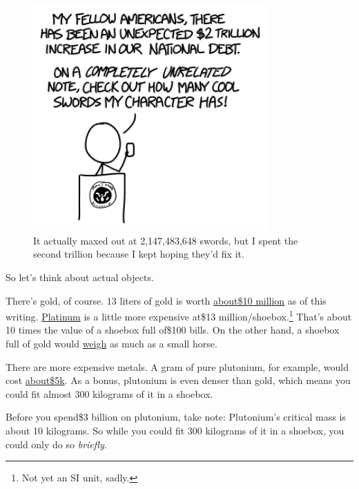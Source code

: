 {\begin{figure}[!htbp]
\centering
\includegraphics[scale=0.5, max width=0.8\textwidth]{imgs/a/108/president.png}
\caption{It actually maxed out at 2,147,483,648 swords, but I spent the second trillion because I kept hoping they'd fix it.}
\end{figure}

{So let's think about actual objects.}

{There's gold, of course. 13 liters of gold is worth \href{http://www.wolframalpha.com/input/?i=13+liters+*+gold+density+*+gold+price}{about\$10 million} as of this writing. \href{http://www.wolframalpha.com/input/?i=13+liters+*+platinum+density+*+platinum+price}{Platinum} is a little more expensive at\$13 million/shoebox.{\footnote{Not yet an SI unit, sadly.} } That's about 10 times the value of a shoebox full of\$100 bills. On the other hand, a shoebox full of gold would \href{http://www.wolframalpha.com/input/?i=gold+density+*+13+liters}{weigh} as much as a small horse.}

{There are more expensive metals. A gram of pure plutonium, for example, would cost \href{http://hypertextbook.com/facts/2008/AndrewMorel.shtml}{about\$5k}. As a bonus, plutonium is even denser than gold, which means you could fit almost 300 kilograms of it in a shoebox.}

{Before you spend\$3 billion on plutonium, take note: Plutonium's critical mass is about 10 kilograms. So while you could fit 300 kilograms of it in a shoebox, you could only do so \emph{briefly}.}

}
